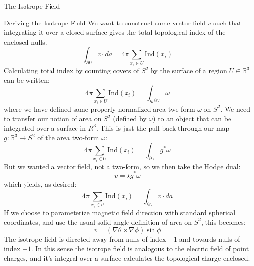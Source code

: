 \documentclass[final]{beamer}
\newlength{\onecolwid}
\begin{document}
\begin{frame}[t]
\begin{columns}[t]
\begin{column}{\onecolwid}
\begin{block}{\huge{The Isotrope Field}}
\begin{block}{Deriving the Isotrope Field}
  We want to construct some vector field $v$ such that integrating it over a closed surface
  gives the total topological index of the enclosed nulls.
  \begin{equation}
    \int_{\partial U}v\cdot da=4\pi\sum_{x_i\in U}\mathrm{Ind}(x_i)
  \end{equation}
  Calculating total index by counting covers of $S^2$ by the surface of a region $U\in\mathbb{R}^3$
  can be written:
  \begin{equation}
    4\pi\sum_{x_i\in U}\mathrm{Ind}(x_i)=\int_{g_*\partial U}\omega
  \end{equation}
  where we have defined some properly normalized area two-form $\omega$ on $S^2$.
  We need to transfer our notion of area on $S^2$ (defined by $\omega$)
  to an object that can be integrated over a surface in $R^3$.
  This is just the pull-back through our map $g:\mathbb{R}^3\rightarrow S^2$
  of the area two-form $\omega$:
  \begin{equation}
    4\pi\sum_{x_i\in U}\mathrm{Ind}(x_i)=\int_{\partial U}g^*\omega
  \end{equation}
  But we wanted a vector field, not a two-form, so we then take the Hodge dual:
  \begin{equation}
    v=\star g^*\omega
  \end{equation}
  which yields, as desired:
  \begin{equation}
    4\pi\sum_{x_i\in U}\mathrm{Ind}(x_i)=\int_{\partial U}v\cdot da
  \end{equation}
  If we choose to parameterize magnetic field direction with standard spherical coordinates,
  and use the usual solid angle definition of area on $S^2$, this becomes:
  \begin{equation}
    v=(\nabla\theta\times\nabla\phi)\sin\phi
  \end{equation}
  The isotrope field is directed away from nulls of index $+1$ and towards nulls of
  index $-1$.
  In this sense the isotrope field is analogous to the electric field of  point charges, and it's
  integral over a surface calculates the topological charge enclosed.
  

\end{block}
\end{block}
\end{column}
\end{columns}
\end{frame}
\end{document}
